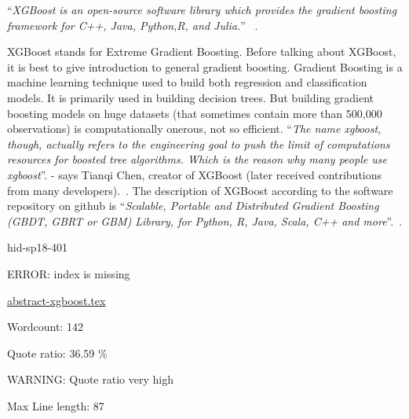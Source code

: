 \color{blue}``\emph{XGBoost is an open-source software library which provides the
gradient boosting framework for C++, Java, Python,R, and Julia.}''\color{black}
~\cite{hid-sp18-401-XGBoost-wiki}.

XGBoost stands for Extreme Gradient Boosting. Before talking about
XGBoost, it is best to give introduction to general gradient
boosting. Gradient Boosting is a machine learning technique used to
build both regression and classification models. It is primarily used
in building decision trees. But building gradient boosting models on
huge datasets (that sometimes contain more than 500,000 observations)
is computationally onerous, not so efficient.  \color{blue}``\emph{The name xgboost,
though, actually refers to the engineering goal to push the limit of
computations resources for boosted tree algorithms. Which is the
reason why many people use xgboost}''\color{black}.  - says Tianqi Chen, creator of
XGBoost (later received contributions from many
developers).~\cite{hid-sp18-401-XGBoost-gen}. The description of
XGBoost according to the software repository on github is \color{blue}``\emph{Scalable,
Portable and Distributed Gradient Boosting (GBDT, GBRT or GBM)
Library, for Python, R, Java, Scala, C++ and
more}''\color{black}.~\cite{hid-sp18-401-XGBoost-git}.


\begin{IU}

hid-sp18-401

ERROR: index is missing

\href{https://github.com/cloudmesh-community/hid-sp18-401/blob/master//technology/abstract-xgboost.tex}{abstract-xgboost.tex}

 

Wordcount: 142


Quote ratio: 36.59 \%

WARNING: Quote ratio very high
 
Max Line length: 87
\end{IU}

